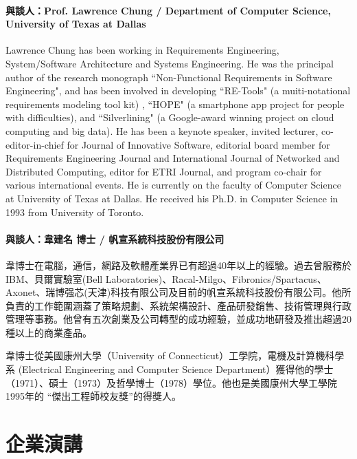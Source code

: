 \documentclass[12pt,oneside,a4paper]{book}
\newcommand{\mIndent}{\hspace{.5cm}}
\begin{document}
\subsubsection{與談人：Prof. Lawrence Chung / Department of Computer Science, University of Texas at Dallas}

\mIndent Lawrence Chung has been working in Requirements Engineering, System/Software Architecture and Systems Engineering. He was the principal author of the research monograph ``Non-Functional Requirements in Software Engineering", and has been involved in developing ``RE-Tools" (a muiti-notational requirements modeling tool kit) , ``HOPE" (a smartphone app project for people with difficulties), and ``Silverlining" (a Google-award winning project on cloud computing and big data).  He has been a keynote speaker, invited lecturer, co-editor-in-chief for Journal of Innovative Software, editorial board member for Requirements Engineering Journal and  International Journal of Networked and Distributed Computing, editor for ETRI Journal, and program co-chair for various international events.  He is currently on the faculty of Computer Science at University of Texas at Dallas.  He received his Ph.D. in Computer Science in 1993 from University of Toronto.


\subsubsection*{與談人：韋建名 博士 / 帆宣系統科技股份有限公司}

\mIndent 韋博士在電腦，通信，網路及軟體產業界已有超過40年以上的經驗。過去曾服務於IBM、貝爾實驗室(Bell Laboratories)、Racal-Milgo、Fibronics/Spartacus、Axonet、瑞博强芯(天津)科技有限公司及目前的帆宣系統科技股份有限公司。他所負責的工作範圍涵蓋了策略規劃、系統架構設計、產品研發銷售、技術管理與行政管理等事務。他曾有五次創業及公司轉型的成功經驗，並成功地研發及推出超過20種以上的商業產品。

\mIndent 韋博士從美國康州大學（University of Connecticut）工學院，電機及計算機科學系 (Electrical Engineering and Computer Science Department）獲得他的學士（1971）、碩士（1973）及哲學博士（1978）學位。他也是美國康州大學工學院1995年的 ``傑出工程師校友獎”的得獎人。

\chapter*{企業演講}
%


\end{document}
